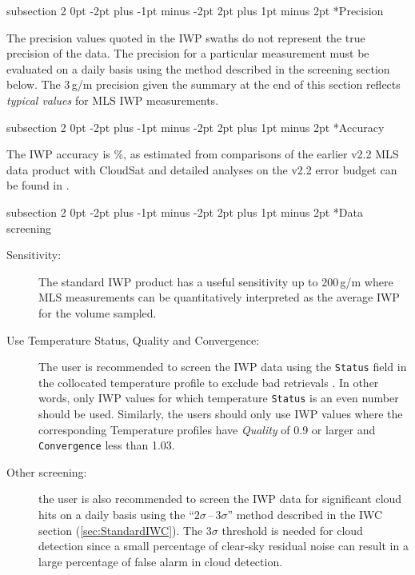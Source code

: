 \documentclass[11pt,draft]{report}
\makeatletter
\renewcommand{\subsection}{\@startsection%
  {subsection}%
  {2}%
  {0pt}%
  {-2pt plus -1pt minus -2pt}%
  {2pt plus 1pt minus 2pt}%
  {\large\sffamily\fontseries{sb}\selectfont\flushleft\color{SectionColor}\figureversion{tabular}}}%
\makeatother
\begin{document}
\subsection*{Precision}

The precision values quoted in the IWP swaths do not represent the true
precision of the data.  The precision for a particular measurement must
be evaluated on a daily basis using the method described in the
screening section below.  The 3\,g/m precision given the summary at
the end of this section reflects \emph{typical values} for MLS IWP
measurements.

\subsection*{Accuracy}

The IWP accuracy is \%, as estimated from comparisons 
of the earlier v2.2 MLS data product with CloudSat and 
detailed analyses on the v2.2 error budget can be found 
in \citet{WuEtal09}.

\subsection*{Data screening}
\label{sec:IWPScreening}
\begin{description}
\item[Sensitivity:] The standard IWP product has a useful sensitivity up
  to 200\,g/m where MLS measurements can be quantitatively
  interpreted as the average IWP for the volume sampled.
\item[Use Temperature Status, Quality and Convergence:] The user is
  recommended to screen the IWP data using the \texttt{Status} field in
  the collocated temperature profile to exclude bad retrievals
  \citep{SchwartzEtal08}. In other words, only IWP values for which
  temperature \texttt{Status} is an even number should be used.
  Similarly, the users should only use IWP values where the
  corresponding Temperature profiles have \emph{Quality} of 0.9 or
  larger and \texttt{Convergence} less than 1.03.
\item[Other screening:] the user is also recommended to screen the IWP
  data for significant cloud hits on a daily basis using the
  ``$2\sigma$\,--\,$3\sigma$'' method described in the IWC section
  (\ref{sec:StandardIWC}). The $3\sigma$ threshold is needed for cloud
  detection since a small percentage of clear-sky residual noise can
  result in a large percentage of false alarm in cloud detection.
\end{description}
\end{document}
